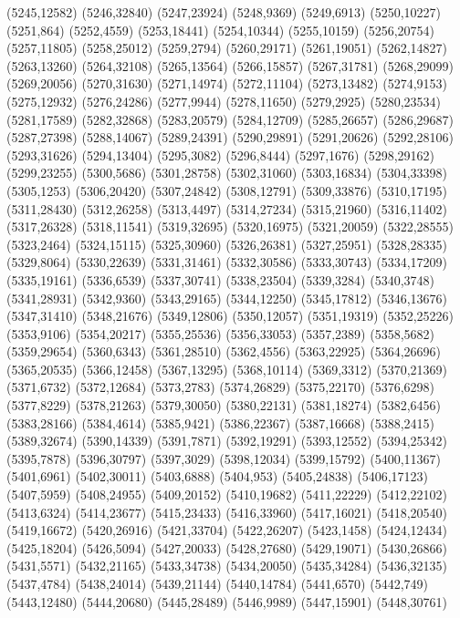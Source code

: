 (5245,12582)
(5246,32840)
(5247,23924)
(5248,9369)
(5249,6913)
(5250,10227)
(5251,864)
(5252,4559)
(5253,18441)
(5254,10344)
(5255,10159)
(5256,20754)
(5257,11805)
(5258,25012)
(5259,2794)
(5260,29171)
(5261,19051)
(5262,14827)
(5263,13260)
(5264,32108)
(5265,13564)
(5266,15857)
(5267,31781)
(5268,29099)
(5269,20056)
(5270,31630)
(5271,14974)
(5272,11104)
(5273,13482)
(5274,9153)
(5275,12932)
(5276,24286)
(5277,9944)
(5278,11650)
(5279,2925)
(5280,23534)
(5281,17589)
(5282,32868)
(5283,20579)
(5284,12709)
(5285,26657)
(5286,29687)
(5287,27398)
(5288,14067)
(5289,24391)
(5290,29891)
(5291,20626)
(5292,28106)
(5293,31626)
(5294,13404)
(5295,3082)
(5296,8444)
(5297,1676)
(5298,29162)
(5299,23255)
(5300,5686)
(5301,28758)
(5302,31060)
(5303,16834)
(5304,33398)
(5305,1253)
(5306,20420)
(5307,24842)
(5308,12791)
(5309,33876)
(5310,17195)
(5311,28430)
(5312,26258)
(5313,4497)
(5314,27234)
(5315,21960)
(5316,11402)
(5317,26328)
(5318,11541)
(5319,32695)
(5320,16975)
(5321,20059)
(5322,28555)
(5323,2464)
(5324,15115)
(5325,30960)
(5326,26381)
(5327,25951)
(5328,28335)
(5329,8064)
(5330,22639)
(5331,31461)
(5332,30586)
(5333,30743)
(5334,17209)
(5335,19161)
(5336,6539)
(5337,30741)
(5338,23504)
(5339,3284)
(5340,3748)
(5341,28931)
(5342,9360)
(5343,29165)
(5344,12250)
(5345,17812)
(5346,13676)
(5347,31410)
(5348,21676)
(5349,12806)
(5350,12057)
(5351,19319)
(5352,25226)
(5353,9106)
(5354,20217)
(5355,25536)
(5356,33053)
(5357,2389)
(5358,5682)
(5359,29654)
(5360,6343)
(5361,28510)
(5362,4556)
(5363,22925)
(5364,26696)
(5365,20535)
(5366,12458)
(5367,13295)
(5368,10114)
(5369,3312)
(5370,21369)
(5371,6732)
(5372,12684)
(5373,2783)
(5374,26829)
(5375,22170)
(5376,6298)
(5377,8229)
(5378,21263)
(5379,30050)
(5380,22131)
(5381,18274)
(5382,6456)
(5383,28166)
(5384,4614)
(5385,9421)
(5386,22367)
(5387,16668)
(5388,2415)
(5389,32674)
(5390,14339)
(5391,7871)
(5392,19291)
(5393,12552)
(5394,25342)
(5395,7878)
(5396,30797)
(5397,3029)
(5398,12034)
(5399,15792)
(5400,11367)
(5401,6961)
(5402,30011)
(5403,6888)
(5404,953)
(5405,24838)
(5406,17123)
(5407,5959)
(5408,24955)
(5409,20152)
(5410,19682)
(5411,22229)
(5412,22102)
(5413,6324)
(5414,23677)
(5415,23433)
(5416,33960)
(5417,16021)
(5418,20540)
(5419,16672)
(5420,26916)
(5421,33704)
(5422,26207)
(5423,1458)
(5424,12434)
(5425,18204)
(5426,5094)
(5427,20033)
(5428,27680)
(5429,19071)
(5430,26866)
(5431,5571)
(5432,21165)
(5433,34738)
(5434,20050)
(5435,34284)
(5436,32135)
(5437,4784)
(5438,24014)
(5439,21144)
(5440,14784)
(5441,6570)
(5442,749)
(5443,12480)
(5444,20680)
(5445,28489)
(5446,9989)
(5447,15901)
(5448,30761)
